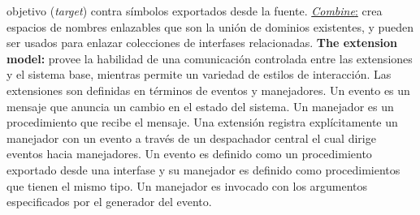 objetivo (\textit{target}) contra símbolos exportados desde la fuente. \underline{\textit{Combine}:} crea espacios de nombres enlazables que son la unión de dominios existentes, y pueden ser usados para enlazar colecciones de interfases relacionadas. \textbf{The extension model:} provee la habilidad de una comunicación controlada entre las extensiones y el sistema base, mientras permite un variedad de estilos de interacción. Las extensiones son definidas en términos de eventos y manejadores. Un evento es un mensaje que anuncia un cambio en el estado del sistema. Un manejador es un procedimiento que recibe el mensaje. Una extensión registra explícitamente un manejador con un evento a través de un despachador central el cual dirige eventos hacia manejadores. Un evento es definido como un procedimiento exportado desde una interfase y su manejador es definido como procedimientos que tienen el mismo tipo. Un manejador es invocado con los argumentos especificados por el generador del evento.

